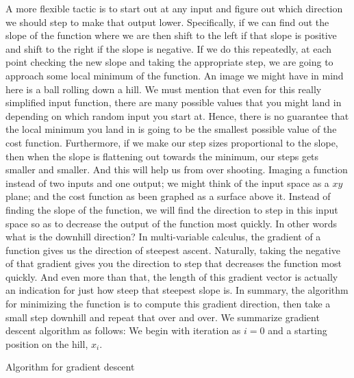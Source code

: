 \documentclass[master]{thesis-uestc}
\begin{document}
A more flexible tactic is to start out at any input and figure out which direction we should step to make that output lower. Specifically, if we can find out the slope of the function where we are then shift to the left if that slope is positive and shift to the right if the slope is negative. If we do this repeatedly, at each point checking the new slope and taking the appropriate step, we are going to approach some local minimum of the function. An image we might have in mind here is a ball rolling down a hill. We must mention that even for this really simplified input function, there are many possible values that you might land in depending on which random input you start at. Hence, there is no guarantee that the local minimum you land in is going to be the smallest possible value of the cost function. Furthermore, if we make our step sizes proportional to the slope, then when the slope is flattening out towards the minimum, our steps gets smaller and smaller. And this will help us from over shooting.
Imaging a function instead of two inputs and one output; we might think of the input space as a $xy$ plane; and the cost function as been graphed as a surface above it. Instead of finding the slope of the function, we will find the direction to step in this input space so as to decrease the output of the function most quickly. In other words what is the downhill direction? In multi-variable calculus, the gradient of a function gives us the direction of steepest ascent. Naturally, taking the negative of that gradient gives you the direction to step that decreases the function most quickly. And even more than that, the length of this gradient vector is actually an indication for just how steep that steepest slope is. In summary, the algorithm for minimizing the function is to compute this gradient direction, then take a small step downhill and repeat that over and over.
We summarize gradient descent algorithm as follows:
We begin with iteration as $i = 0$ and a starting position on the hill, $x_i$.
\begin{algorithm}[H]
\SetAlgoLined
{}
 \caption{Algorithm for gradient descent}
\end{algorithm}
\end{document}
